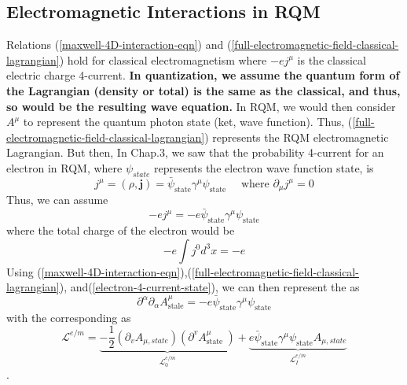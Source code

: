 \subsection{Electromagnetic Interactions in RQM}
Relations (\ref{maxwell-4D-interaction-eqn}) and (\ref{full-electromagnetic-field-classical-lagrangian}) hold for classical electromagnetism where $-ej^{\mu}$ is the classical electric charge 4-current. \textbf{In quantization, we assume the quantum form of the Lagrangian (density or total) is the same as the classical, and thus, so would be the resulting wave equation.} In RQM, we would then consider $A^{\mu}$ to represent the quantum photon state (ket, wave function). Thus, (\ref{full-electromagnetic-field-classical-lagrangian}) represents the RQM electromagnetic Lagrangian. But then,  In Chap.3, we saw that the probability 4-current for an electron in RQM, where $\psi_{state}$ represents the electron wave function state, is
$$
j^{\mu}=(\rho, \mathbf{j})=\bar{\psi}_{\text {state}} \gamma^{\mu} \psi_{\text {state}} \quad \text { where } \partial_{\mu} j^{\mu}=0
$$
 Thus, we can assume
\begin{equation}
-e j^{\mu}=-e \bar{\psi}_{\text {state}} \gamma^{\mu} \psi_{\text {state}}
\label{electron-4-current-state}
\end{equation}
where the total charge of the electron would be
$$
-e \int j^{0} d^{3} x=-e
$$
Using (\ref{maxwell-4D-interaction-eqn}),(\ref{full-electromagnetic-field-classical-lagrangian}), and(\ref{electron-4-current-state}), we can then represent the \textbf{} as
\begin{equation}
\partial^{\alpha} \partial_{\alpha} A_{\text {stale}}^{\mu}=-e \bar{\psi}_{\text {state}} \gamma^{\mu} \psi_{\text {state}}
\label{RQM-photon-interaction-wave-eqn}
\end{equation}
with the corresponding \textbf{} as
\begin{equation}
\mathcal{L}^{e / m}=\underbrace{-\frac{1}{2}\left(\partial_{v} A_{\mu,state}\right)\left(\partial^{v} A_{\text {state }}^{\mu}\right)}_{\mathcal{L}_0^{e/m}}+\underbrace{e \bar{\psi}_{\text {state}} \gamma^{\mu} \psi_{\text {state}} A_{\mu,state}}_{\mathcal{L}_I^{e/m}}
\label{RQM-em-interaction Lagrangian-for-photon}
\end{equation}
.
